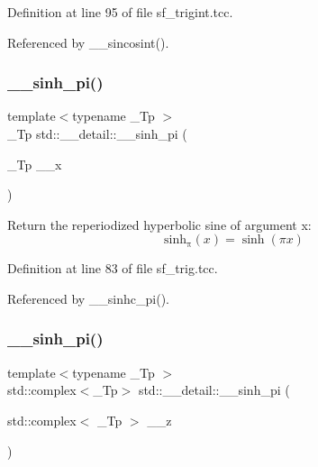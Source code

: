Definition at line 95 of file sf\+\_\+trigint.\+tcc.



Referenced by \+\_\+\+\_\+sincosint().

\mbox{\label{namespacestd_1_1____detail_a6dd7153012cc7885e76a47a5162981da}} 
\subsubsection{\texorpdfstring{\+\_\+\+\_\+sinh\+\_\+pi()}{\_\_sinh\_pi()}\hspace{0.1cm}{\footnotesize\ttfamily [1/2]}}
{\footnotesize\ttfamily template$<$typename \+\_\+\+Tp $>$ \\
\+\_\+\+Tp std\+::\+\_\+\+\_\+detail\+::\+\_\+\+\_\+sinh\+\_\+pi (\begin{DoxyParamCaption}\item[{\+\_\+\+Tp}]{\+\_\+\+\_\+x }\end{DoxyParamCaption})}

Return the reperiodized hyperbolic sine of argument x\+: \[ \mathrm{sinh_\pi}(x) = \sinh(\pi x) \] 

Definition at line 83 of file sf\+\_\+trig.\+tcc.



Referenced by \+\_\+\+\_\+sinhc\+\_\+pi().

\mbox{\label{namespacestd_1_1____detail_aa8fe06b3d9584ea9c81b0349ba7eb2dc}} 
\subsubsection{\texorpdfstring{\+\_\+\+\_\+sinh\+\_\+pi()}{\_\_sinh\_pi()}\hspace{0.1cm}{\footnotesize\ttfamily [2/2]}}
{\footnotesize\ttfamily template$<$typename \+\_\+\+Tp $>$ \\
std\+::complex$<$\+\_\+\+Tp$>$ std\+::\+\_\+\+\_\+detail\+::\+\_\+\+\_\+sinh\+\_\+pi (\begin{DoxyParamCaption}\item[{std\+::complex$<$ \+\_\+\+Tp $>$}]{\+\_\+\+\_\+z }\end{DoxyParamCaption})}

